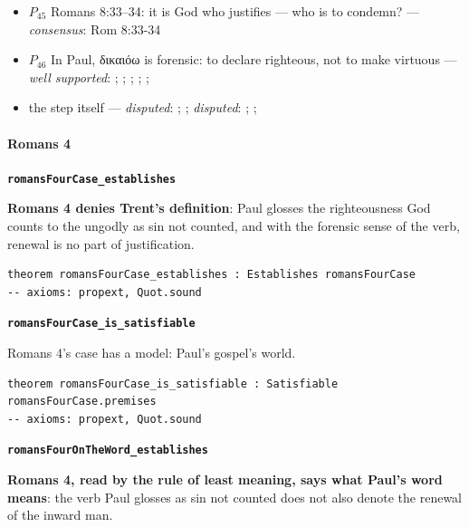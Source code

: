 \documentclass[11pt]{article}
\begin{document}
\begin{itemize}
\begin{itemize}
\item \(P_{45}\) Romans 8:33–34: it is God who justifies — who is to condemn? --- \emph{consensus}: Rom 8:33-34
\item \(P_{46}\) In Paul, δικαιόω is forensic: to declare righteous, not to make virtuous --- \emph{well supported}: \cite[s.v. δικαιόω]{bauer-danker-lexicon-2000}; \cite{morris-apostolic-preaching-1965}; \cite[p. 80]{moo-romans-1996}; \cite{irons-righteousness-of-god-2015}; \cite{wright-justification-2009}; \cite[ad loc. Rom 3:24]{fitzmyer-romans-1993}
\item the step itself --- \emph{disputed}: \cite[ad loc. Gal 1:6]{moo-galatians-2013}; \cite[XI.1]{westminster-confession-1647}; \emph{disputed}: \cite[XI.1]{westminster-confession-1647}; \cite[III.xi.2]{calvin-institutes-1960}; \cite{morris-apostolic-preaching-1965}
\end{itemize}
\end{itemize}
\paragraph*{Romans 4}
\leavevmode\par
\par\medskip\noindent\textbf{\texttt{romans\allowbreak{}Four\allowbreak{}Case\_\allowbreak{}establishes}}\par\nobreak\noindent
\textbf{Romans 4 denies Trent's definition}: Paul glosses the righteousness God counts to the ungodly as sin not counted, and with the forensic sense of the verb, renewal is no part of justification.

{\small\begin{verbatim}
theorem romansFourCase_establishes : Establishes romansFourCase
-- axioms: propext, Quot.sound
\end{verbatim}}
\par\medskip\noindent\textbf{\texttt{romans\allowbreak{}Four\allowbreak{}Case\_\allowbreak{}is\_\allowbreak{}satisfiable}}\par\nobreak\noindent
Romans 4's case has a model: Paul's gospel's world.

{\small\begin{verbatim}
theorem romansFourCase_is_satisfiable : Satisfiable romansFourCase.premises
-- axioms: propext, Quot.sound
\end{verbatim}}
\par\medskip\noindent\textbf{\texttt{romans\allowbreak{}Four\allowbreak{}On\allowbreak{}The\allowbreak{}Word\_\allowbreak{}establishes}}\par\nobreak\noindent
\textbf{Romans 4, read by the rule of least meaning, says what Paul's word means}: the verb Paul glosses as sin not counted does not also denote the renewal of the inward man.
\end{document}
